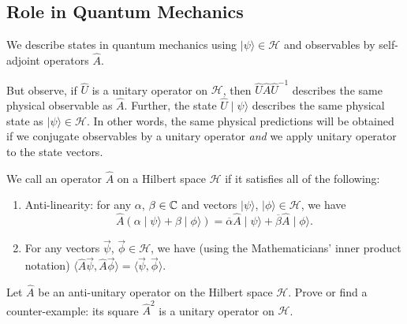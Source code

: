 \subsection{Role in Quantum Mechanics}

\M
We describe states in quantum mechanics using
$|\psi\rangle\in\mathcal{H}$
and observables by self-adjoint operators $\widehat{A}$.

But observe, if $\widehat{U}$ is a unitary operator on $\mathcal{H}$,
then $\widehat{U}\widehat{A}\widehat{U}^{-1}$ describes the same
physical observable as $\widehat{A}$. Further, the state
$\widehat{U}\mid\psi\rangle$ describes the same physical state as
$|\psi\rangle\in\mathcal{H}$.
In other words, the same physical predictions will be obtained if we
conjugate observables by a unitary operator \emph{and} we apply unitary
operator to the state vectors.

\begin{definition}
We call an operator $\widehat{A}$ on a Hilbert space $\mathcal{H}$
 if it satisfies all of the following:
\begin{enumerate}
\item Anti-linearity: for any $\alpha$, $\beta\in\mathbb{C}$ and vectors
  $|\psi\rangle$, $|\phi\rangle\in\mathcal{H}$, we have
  \begin{equation}
\widehat{A}(\alpha\mid\psi\rangle + \beta\mid\phi\rangle)
=\overline{\alpha}\widehat{A}\mid\psi\rangle
+\overline{\beta}\widehat{A}\mid\phi\rangle.
  \end{equation}
\item For any vectors $\vec{\psi}$, $\vec{\phi}\in\mathcal{H}$, we have
  (using the Mathematicians' inner product notation)
$\langle\widehat{A}\vec{\psi},\widehat{A}\vec{\phi}\rangle=\langle\vec{\psi},\vec{\phi}\rangle$.
\end{enumerate}
\end{definition}

\begin{exercise}
Let $\widehat{A}$ be an anti-unitary operator on 
the Hilbert space $\mathcal{H}$. Prove or find a counter-example: its
square $\widehat{A}^{2}$ is a unitary operator on $\mathcal{H}$.
\end{exercise}

